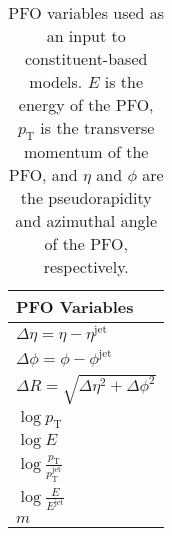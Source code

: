\begin{table}[!htb]
    \centering
    \caption{PFO variables used as an input to constituent-based models. $E$ is the energy of the PFO, $p_\mathrm{T}$ is the transverse momentum of the PFO, and $\eta$ and $\phi$ are the pseudorapidity and azimuthal angle of the PFO, respectively. \cite{part}}
    \label{tab:pfo_variables}
    \begin{tabular}{l}
    \toprule
        PFO Variables \\
    \midrule
        $\Delta \eta = \eta - \eta^\mathrm{jet}$ \\
        $\Delta \phi = \phi - \phi^\mathrm{jet}$ \\
        $\Delta R = \sqrt{\Delta \eta^2 + \Delta \phi^2}$ \\
        $\log{p_\mathrm{T}}$ \\
        $\log{E}$ \\
        $\log{\frac{p_\mathrm{T}}{p_\mathrm{T}^\mathrm{jet}}}$ \\
        $\log{\frac{E}{E^\mathrm{jet}}}$ \\
        $m$ \\
    \bottomrule
    \end{tabular}
\end{table}
    